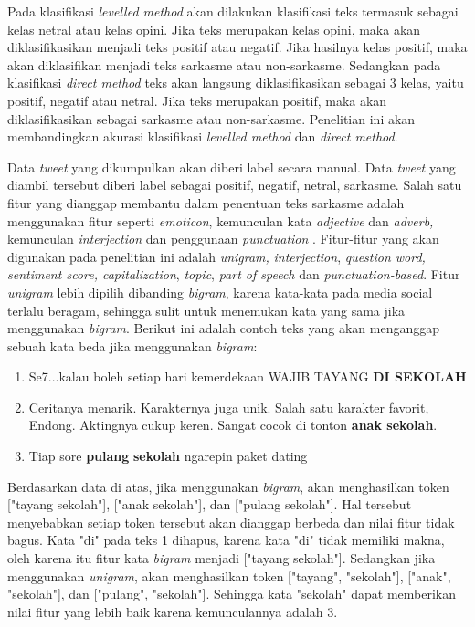 Pada klasifikasi \textit{levelled method }akan dilakukan klasifikasi teks termasuk sebagai kelas netral atau kelas opini. Jika teks merupakan kelas opini, maka akan diklasifikasikan menjadi teks positif atau negatif. Jika hasilnya kelas positif, maka akan diklasifikan menjadi teks sarkasme atau non-sarkasme. Sedangkan pada klasifikasi \textit{direct method} teks akan langsung diklasifikasikan sebagai 3 kelas, yaitu positif, negatif atau netral. Jika teks merupakan positif, maka akan diklasifikasikan sebagai sarkasme atau non-sarkasme. Penelitian ini akan membandingkan akurasi klasifikasi \textit{levelled method} dan \textit{direct method}.

Data \textit{tweet} yang dikumpulkan akan diberi label secara manual. Data \textit{tweet} yang diambil tersebut diberi label sebagai positif, negatif, netral, sarkasme. Salah satu fitur yang dianggap membantu dalam penentuan teks sarkasme adalah menggunakan fitur seperti \textit{emoticon}, kemunculan kata \textit{adjective }dan \textit{adverb, }kemunculan \textit{interjection }dan penggunaan \textit{punctuation }\cite{5}. Fitur-fitur yang akan digunakan pada penelitian ini adalah \textit{unigram,} \textit{interjection}, \textit{question word,} \textit{sentiment score, capitalization},
\textit{ topic}, \textit{part of speech} dan \textit{punctuation-based}. Fitur \textit{unigram }lebih dipilih dibanding \textit{bigram},\textit{ }karena kata-kata pada media social terlalu beragam, sehingga sulit untuk menemukan kata yang sama jika 
menggunakan \textit{bigram}. Berikut ini adalah contoh teks yang akan menganggap sebuah kata beda jika menggunakan \textit{bigram}:

\begin{enumerate}[leftmargin=*]
	\item Se7...kalau boleh setiap hari kemerdekaan WAJIB TAYANG \textbf{DI 
		SEKOLAH}
	\item Ceritanya menarik. Karakternya juga unik. Salah satu karakter 
	favorit, Endong. Aktingnya cukup keren. Sangat cocok di tonton \textbf{
		anak sekolah}.
	\item Tiap sore \textbf{pulang} \textbf{sekolah} ngarepin paket 
	dating
\end{enumerate}

Berdasarkan data di atas, jika menggunakan \textit{bigram}, akan menghasilkan token ["tayang sekolah"], ["anak sekolah"], dan ["pulang sekolah"]. Hal tersebut menyebabkan setiap token tersebut akan dianggap berbeda dan nilai fitur tidak bagus. Kata "di" pada teks 1 dihapus, karena kata "di" tidak memiliki makna, oleh karena itu fitur kata \textit{bigram} menjadi ["tayang sekolah"]. Sedangkan jika menggunakan \textit{unigram}, akan menghasilkan token ["tayang", "sekolah"], ["anak", "sekolah"], dan ["pulang", "sekolah"]. Sehingga kata "sekolah" dapat memberikan nilai fitur yang lebih baik karena kemunculannya adalah 3.


